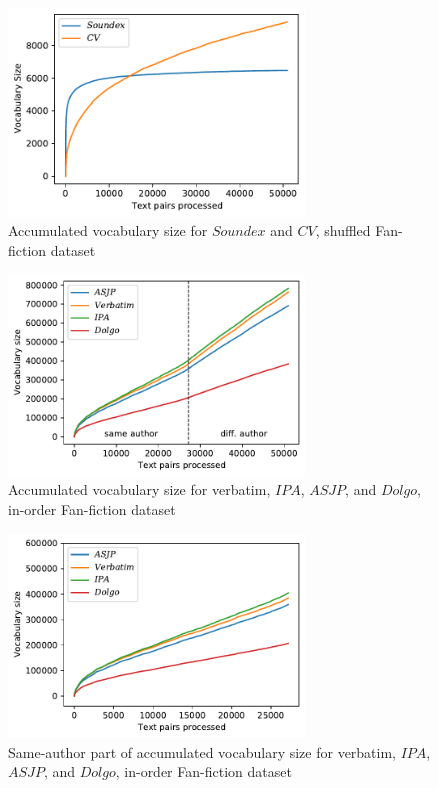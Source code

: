 \begin{figure}
  \centering
  \includegraphics[width=0.7\textwidth]{figures/cum_vocab_size_ff_shuffled_soundexcv}
  \caption{Accumulated vocabulary size for $Soundex$ and $CV$, shuffled Fan-fiction dataset}
  \label{fig:cumvocab_soundexcv}
\end{figure}
\begin{figure}
  \centering
  \includegraphics[width=0.7\textwidth]{figures/cum_vocab_size_ff_inorder_all}
  \caption{Accumulated vocabulary size for verbatim, $IPA$, $ASJP$, and $Dolgo$, in-order Fan-fiction dataset}
  \label{fig:cumvocab_all}
\end{figure}
\begin{figure}
  \centering
  \includegraphics[width=0.7\textwidth]{figures/cum_vocab_size_ff_inorder_onlysame_ipa}
  \caption{Same-author part of accumulated vocabulary size for verbatim, $IPA$, $ASJP$, and $Dolgo$, in-order Fan-fiction dataset}
  \label{fig:cumvocab_same}
\end{figure}
